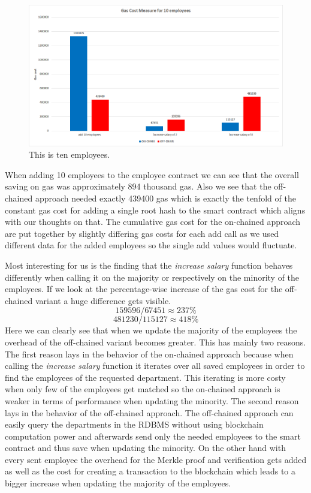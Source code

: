 \begin{figure}[t]%
\centering
\includegraphics[width=1.0\textwidth]{images/05_evaluation/05_gas_cost_ten.png}
\caption{\label{fig:05_gas_cost_ten}This is ten employees.}
\end{figure}

When adding 10 employees to the employee contract we can see that the overall saving on gas was approximately 894 thousand gas.
Also we see that the off-chained approach needed exactly 439400 gas which is exactly the tenfold of the constant gas cost for adding a single root hash to the smart contract which aligns with our thoughts on that.
The cumulative gas cost for the on-chained approach are put together by slightly differing gas costs for each add call as we used different data for the added employees so the single add values would fluctuate.

Most interesting for us is the finding that the \textit{increase salary} function behaves differently when calling it on the majority or respectively on the minority of the employees.
If we look at the percentage-wise increase of the gas cost for the off-chained variant a huge difference gets visible.
$$ 159596 / 67451 \approx 237\% $$
$$ 481230 / 115127 \approx 418\% $$
Here we can clearly see that when we update the majority of the employees the overhead of the off-chained variant becomes greater.
This has mainly two reasons.
The first reason lays in the behavior of the on-chained approach because when calling the \textit{increase salary} function it iterates over all saved employees in order to find the employees of the requested department.
This iterating is more costy when only few of the employees get matched so the on-chained approach is weaker in terms of performance when updating the minority.
The second reason lays in the behavior of the off-chained approach.
The off-chained approach can easily query the departments in the RDBMS without using blockchain computation power and afterwards send only the needed employees to the smart contract and thus save when updating the minority.
On the other hand with every sent employee the overhead for the Merkle proof and verification gets added as well as the cost for creating a transaction to the blockchain which leads to a bigger increase when updating the majority of the employees.

